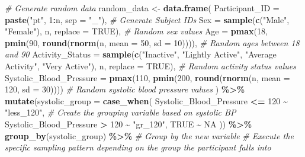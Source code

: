 \documentclass[
]{article}
\newenvironment{Shaded}{\begin{snugshade}}{\end{snugshade}}
\newcommand{\AttributeTok}[1]{\textcolor[rgb]{0.13,0.29,0.53}{#1}}
\newcommand{\CommentTok}[1]{\textcolor[rgb]{0.56,0.35,0.01}{\textit{#1}}}
\newcommand{\ConstantTok}[1]{\textcolor[rgb]{0.56,0.35,0.01}{#1}}
\newcommand{\DecValTok}[1]{\textcolor[rgb]{0.00,0.00,0.81}{#1}}
\newcommand{\FunctionTok}[1]{\textcolor[rgb]{0.13,0.29,0.53}{\textbf{#1}}}
\newcommand{\NormalTok}[1]{#1}
\newcommand{\OtherTok}[1]{\textcolor[rgb]{0.56,0.35,0.01}{#1}}
\newcommand{\SpecialCharTok}[1]{\textcolor[rgb]{0.81,0.36,0.00}{\textbf{#1}}}
\newcommand{\StringTok}[1]{\textcolor[rgb]{0.31,0.60,0.02}{#1}}
\begin{document}
\begin{Shaded}
\begin{Highlighting}[]
\CommentTok{\# Generate random data}
\NormalTok{random\_data }\OtherTok{\textless{}{-}} \FunctionTok{data.frame}\NormalTok{(}
  \AttributeTok{Participant\_ID =} \FunctionTok{paste}\NormalTok{(}\StringTok{"pt"}\NormalTok{, }\DecValTok{1}\SpecialCharTok{:}\NormalTok{n, }\AttributeTok{sep =} \StringTok{"\_"}\NormalTok{),  }\CommentTok{\# Generate Subject IDs}
  \AttributeTok{Sex =} \FunctionTok{sample}\NormalTok{(}\FunctionTok{c}\NormalTok{(}\StringTok{"Male"}\NormalTok{, }\StringTok{"Female"}\NormalTok{), n, }\AttributeTok{replace =} \ConstantTok{TRUE}\NormalTok{),  }\CommentTok{\# Random sex values}
  \AttributeTok{Age =} \FunctionTok{pmax}\NormalTok{(}\DecValTok{18}\NormalTok{, }\FunctionTok{pmin}\NormalTok{(}\DecValTok{90}\NormalTok{, }\FunctionTok{round}\NormalTok{(}\FunctionTok{rnorm}\NormalTok{(n, }\AttributeTok{mean =} \DecValTok{50}\NormalTok{, }\AttributeTok{sd =} \DecValTok{10}\NormalTok{)))),  }\CommentTok{\# Random ages between 18 and 90}
  \AttributeTok{Activity\_Status =} \FunctionTok{sample}\NormalTok{(}\FunctionTok{c}\NormalTok{(}\StringTok{"Inactive"}\NormalTok{, }\StringTok{"Lightly Active"}\NormalTok{, }\StringTok{"Average Activity"}\NormalTok{, }\StringTok{"Very Active"}\NormalTok{), n, }\AttributeTok{replace =} \ConstantTok{TRUE}\NormalTok{),  }\CommentTok{\# Random activity status values}
  \AttributeTok{Systolic\_Blood\_Pressure =} \FunctionTok{pmax}\NormalTok{(}\DecValTok{110}\NormalTok{, }\FunctionTok{pmin}\NormalTok{(}\DecValTok{200}\NormalTok{, }\FunctionTok{round}\NormalTok{(}\FunctionTok{rnorm}\NormalTok{(n, }\AttributeTok{mean =} \DecValTok{120}\NormalTok{, }\AttributeTok{sd =} \DecValTok{30}\NormalTok{))))  }\CommentTok{\# Random systolic blood pressure values}
\NormalTok{) }\SpecialCharTok{\%\textgreater{}\%}
  \FunctionTok{mutate}\NormalTok{(}\AttributeTok{systolic\_group =} \FunctionTok{case\_when}\NormalTok{(}
\NormalTok{    Systolic\_Blood\_Pressure }\SpecialCharTok{\textless{}=} \DecValTok{120} \SpecialCharTok{\textasciitilde{}} \StringTok{"less\_120"}\NormalTok{, }\CommentTok{\# Create the grouping variable based on systolic BP}
\NormalTok{    Systolic\_Blood\_Pressure }\SpecialCharTok{\textgreater{}} \DecValTok{120} \SpecialCharTok{\textasciitilde{}} \StringTok{"gr\_120"}\NormalTok{,}
    \ConstantTok{TRUE} \SpecialCharTok{\textasciitilde{}} \ConstantTok{NA}
\NormalTok{  )) }\SpecialCharTok{\%\textgreater{}\%}
  \FunctionTok{group\_by}\NormalTok{(systolic\_group) }\SpecialCharTok{\%\textgreater{}\%} \CommentTok{\# Group by the new variable }
  \CommentTok{\# Execute the specific sampling pattern depending on the group the participant falls into}

\end{Highlighting}
\end{Shaded}
\end{document}
